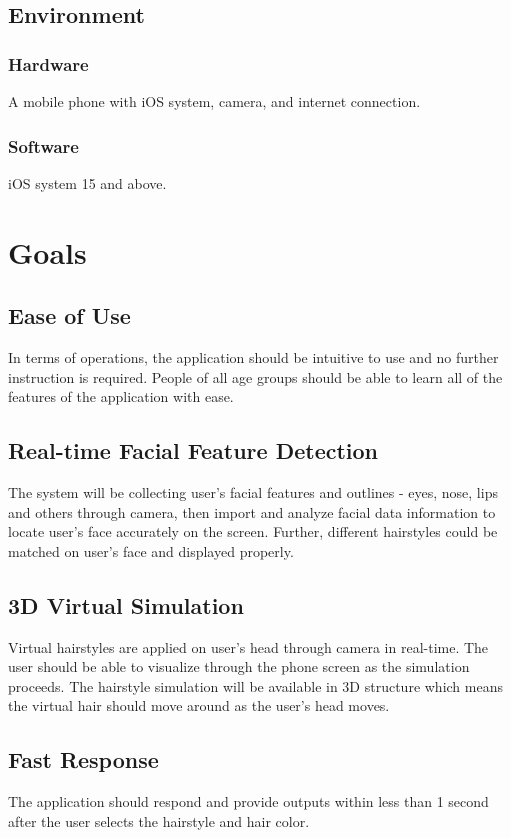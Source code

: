 \documentclass{article}
\begin{document}
\subsection{Environment}

\subsubsection{Hardware}
A mobile phone with iOS system, camera, and internet connection.

\subsubsection{Software}
iOS system 15 and above.

\section{Goals}

\subsection{Ease of Use}
In terms of operations, the application should be intuitive to use and no further instruction is required. People of all age groups should be able to learn all of the features of the application with ease.
\subsection{Real-time Facial Feature Detection}
The system will be collecting user's facial features and outlines - eyes, nose, lips and others through camera, then import and analyze facial data information to locate user's face accurately on the screen. Further, different hairstyles could be matched on user's face and displayed properly.
\subsection{3D Virtual Simulation}
Virtual hairstyles are applied on user's head through camera in real-time. The user should be able to visualize through the phone screen as the simulation proceeds. The hairstyle simulation will be available in 3D structure which means the virtual hair should move around as the user's head moves. 
\subsection{Fast Response}
The application should respond and provide outputs within less than 1 second after the user selects the hairstyle and hair color.
\end{document}
